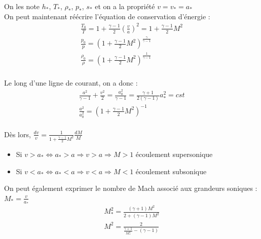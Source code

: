\documentclass[../main.tex]{subfiles}
\begin{document}
On les note $h_*$, $T_*$, $\rho_*$, $p_*$, $s_*$ et on a la propriété $v = v_* = a_*$\\


On peut maintenant réécrire l'équation de conservation d'énergie : \begin{equation}
\begin{gathered}
    \frac{T_0}{T} = 1+\frac{\gamma-1}{2} (\frac{v}{a})^2 = 1+ \frac{\gamma-1}{2} M^2\\
    \frac{p_0}{p} = (1+\frac{\gamma-1}{2}M^2)^{\frac{\gamma}{\gamma-1}}\\
    \frac{\rho_0}{\rho} = (1+\frac{\gamma-1}{2}M^2)^{\frac{1}{\gamma-1}}\\
    \end{gathered}
\end{equation}

Le long d'une ligne de courant, on a donc : \begin{equation}\begin{gathered}
    \frac{a^2}{\gamma-1} + \frac{v^2}{2} = \frac{a_0^2}{\gamma-1} = \frac{\gamma+1}{2(\gamma-1)}a_*^2 = cst\\
    \frac{a^2}{a_0^2} = (1+\frac{\gamma-1}{2}M^2)^{-1}\\
    \end{gathered}
\end{equation}

Dès lors, $\frac{dv}{v} = \frac{1}{1+\frac{\gamma-1}{2}M^2} \frac{dM}{M}$\\

\begin{itemize}
    \item Si $v> a_* \Leftrightarrow a_*> a \Rightarrow v>a \Rightarrow M>1$ écoulement supersonique\\
    \item Si $v< a_* \Leftrightarrow a_*< a \Rightarrow v<a \Rightarrow M<1$ écoulement subsonique\\
\end{itemize}

On peut également exprimer le nombre de Mach associé aux grandeurs soniques : $M_* = \frac{v}{a_*}$\\

\begin{equation}
    \begin{gathered}
        M_*^2 = \frac{(\gamma+1) M^2}{2+(\gamma-1)M^2}\\
        M^2 = \frac{2}{\frac{\gamma+1}{M_*^2} - (\gamma-1)}\\
    \end{gathered}
\end{equation}
\end{document}
